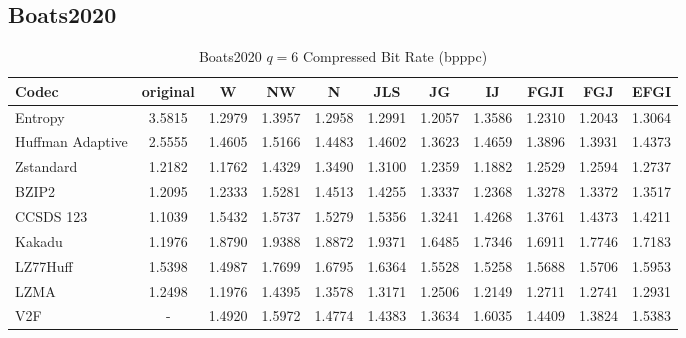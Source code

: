 \documentclass{article}
\begin{document}
\subsection{Boats2020}
\begin{table}[h!]
\centering
\caption{Boats2020 $q=6$ Compressed Bit Rate (bpppc)}
\begin{tabular}{|l|cccccccccc|}
\hline
Codec &  original &      W &     NW &      N &    JLS &     JG &     IJ &   FGJI &    FGJ &   EFGI \\
\hline
Entropy & 3.5815 & 1.2979 & 1.3957 & 1.2958 & 1.2991 & 1.2057 & 1.3586 & 1.2310 & 1.2043 & 1.3064 \\
\hline
Huffman Adaptive &    2.5555 & 1.4605 & 1.5166 & 1.4483 & 1.4602 & 1.3623 & 1.4659 & 1.3896 & 1.3931 & 1.4373 \\
Zstandard        &    1.2182 & 1.1762 & 1.4329 & 1.3490 & 1.3100 & 1.2359 & 1.1882 & 1.2529 & 1.2594 & 1.2737 \\
BZIP2            &    1.2095 & 1.2333 & 1.5281 & 1.4513 & 1.4255 & 1.3337 & 1.2368 & 1.3278 & 1.3372 & 1.3517 \\
CCSDS 123        &    1.1039 & 1.5432 & 1.5737 & 1.5279 & 1.5356 & 1.3241 & 1.4268 & 1.3761 & 1.4373 & 1.4211 \\
Kakadu           &    1.1976 & 1.8790 & 1.9388 & 1.8872 & 1.9371 & 1.6485 & 1.7346 & 1.6911 & 1.7746 & 1.7183 \\
LZ77Huff         &    1.5398 & 1.4987 & 1.7699 & 1.6795 & 1.6364 & 1.5528 & 1.5258 & 1.5688 & 1.5706 & 1.5953 \\
LZMA             &    1.2498 & 1.1976 & 1.4395 & 1.3578 & 1.3171 & 1.2506 & 1.2149 & 1.2711 & 1.2741 & 1.2931 \\
V2F              &   - & 1.4920 & 1.5972 & 1.4774 & 1.4383 & 1.3634 & 1.6035 & 1.4409 & 1.3824 & 1.5383 \\
\hline
\end{tabular}
\end{table}
\end{document}
